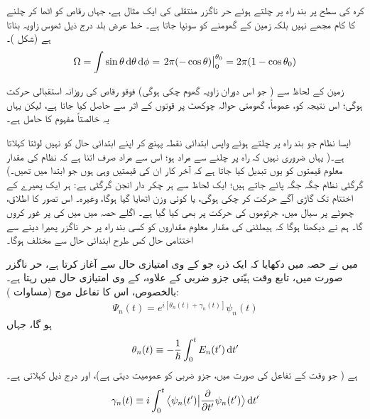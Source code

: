  کرہ کی سطح پر بند راہ پر چلتے ہوئے حر ناگزر منتقلی کی ایک مثال  ہے، جہاں رقاص کو اٹھا کر چلنے کا کام مجھے نہیں بلکہ زمین کے گھومنے کو سونپا جاتا ہے۔ خط عرض بلد  درج ذیل ٹھوس زاویہ بناتا ہے (شکل )۔ 
\begin{align}\label{مساوات_حر_ٹھوس_زاویہ}
\Omega = \int \sin \theta \dif \theta \dif \phi =\left. 2\pi (- \cos \theta)\right\vert_0^{\theta_0} = 2 \pi (1 - \cos \theta_0)
\end{align}
%



زمین کے لحاظ سے ( جو اس دوران  زاویہ گھوم چکی ہوگی) فوقو رقاص کی روزانہ استقبالی حرکت  ہوگی؛ اس نتیجہ کو، عموماً، گھومتی حوالہ چوکھٹ پر  قوتوں کے اثر سے حاصل کیا جاتا ہے، لیکن یہاں یہ خالصتاً  مفہوم کا حامل ہے۔ 

 ایسا نظام جو بند راہ پر چلتے ہوئے واپس ابتدائی نقطہ پہنچ کر اپنے ابتدائی حال کو نہیں لوٹتا  کہلاتا ہے۔( یہاں ضروری نہیں کہ راہ پر چلنے سے مراد  ہو؛ اس سے مراد صرف اتنا ہے کہ نظام کی مقدار معلوم قیمتوں کو یوں تبدیل کیا جاتا ہے کہ آخر کار ان کی قیمتیں وہی ہوں جو ابتدا میں تھیں۔) گرگٹی نظام جگہ جگہ پائے جاتے ہیں؛ ایک لحاظ سے ہر چکر دار انجن گرگٹی ہے: ہر ایک پھیرے کے اختتام تک گاڑی آگے حرکت کر چکی ہوگی، یا کوئی وزن اٹھایا گیا ہوگا، وغیرہ۔ اس تصور کا اطلاق، چھوٹے  پر سیال میں، جرثوموں کی حرکت پر بھی کیا گیا ہے۔ اگلے حصہ میں میں  کی  پر غور کروں گا۔ ہم نے دیکھنا ہوگا کہ ہیملٹنی کی مقدار معلوم مقداروں کو کسی بند راہ پر حر ناگزر پھیرا دینے سے اختتامی حال کس طرح ابتدائی حال سے مختلف ہوگا۔ 


میں نے حصہ  میں دکھایا کہ ایک ذرہ جو  کے  وی امتیازی حال سے آغاز کرتا ہے، حر ناگزر صورت میں، تابع وقت ہیّتی جزو ضربی کے علاوہ،  کے  وی امتیازی حال میں رہتا ہے۔ بالخصوص، اس کا تفاعل موج (مساوات ):
\begin{align}
\Psi_n (t) = e^{i[\theta_n (t) + \gamma_n (t)]} \psi_n (t)
\end{align} 
ہو گا، جہاں 
\begin{align}\label{مساوات_حر_درست_روپ}
\theta_n (t) \equiv - \frac{1}{\hslash} \int_0^t E_n (t') \dif t'
\end{align}
  ہے ( جو وقت کے تفاعل  کی صورت میں، جزو ضربی  کو عمومیت دیتی ہے)، اور درج ذیل  کہلاتی ہے۔
\begin{align}
\gamma_n(t)\equiv i\int_0^t \big\langle \psi_n(t')\big|\frac{\partial}{\partial t'}\psi_n(t')\big \rangle \dif t'
\end{align}


